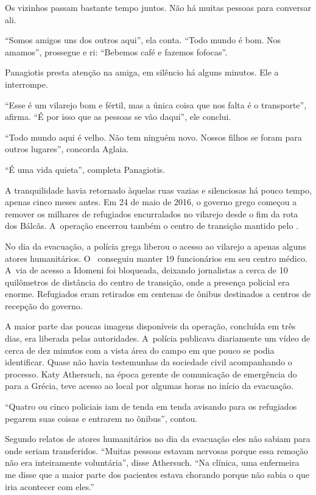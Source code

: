 Os vizinhos passam bastante tempo juntos. Não há muitas pessoas para
conversar ali.

``Somos amigos uns dos outros aqui'', ela conta. ``Todo mundo é bom. Nos
amamos'', prossegue e ri: ``Bebemos café e fazemos fofocas''.

Panagiotis presta atenção na amiga, em silêncio há alguns minutos. Ele a
interrompe.

``Esse é um vilarejo bom e fértil, mas a única coisa que nos falta é o
transporte'', afirma. ``É por isso que as pessoas se vão daqui'',
ele conclui.

``Todo mundo aqui é velho. Não tem ninguém novo. Nossos filhos se foram
para outros lugares'', concorda Aglaia.

``É uma vida quieta'', completa Panagiotis.

A tranquilidade havia retornado àquelas ruas vazias e silenciosas há
pouco tempo, apenas cinco meses antes. Em 24 de maio de 2016, o governo
grego começou a remover os milhares de refugiados encurralados no
vilarejo desde o fim da rota dos Bálcãs. A~operação encerrou também o
centro de transição mantido pelo .

No dia da evacuação, a polícia grega liberou o acesso ao vilarejo a
apenas alguns atores humanitários. O~ conseguiu manter 19
funcionários em seu centro médico. A~via de acesso a Idomeni foi
bloqueada, deixando jornalistas a cerca de 10 quilômetros de distância
do centro de transição, onde a presença policial era enorme. Refugiados
eram retirados em centenas de ônibus destinados a centros de recepção do
governo.

A maior parte das poucas imagens disponíveis da operação, concluída em
três dias, era liberada pelas autoridades. A~polícia publicava
diariamente um vídeo de cerca de dez minutos com a vista área do campo
em que pouco se podia identificar. Quase não havia testemunhas da
sociedade civil acompanhando o processo. Katy Athersuch, na época gerente
de comunicação de emergência do  para a Grécia, teve acesso ao local
por algumas horas no início da evacuação.

``Quatro ou cinco policiais iam de tenda em tenda avisando para os
refugiados pegarem suas coisas e entrarem no ônibus'', contou.

Segundo relatos de atores humanitários no dia da evacuação eles não sabiam para onde seriam 
transferidos. ``Muitas pessoas estavam nervosas
porque essa remoção não era inteiramente voluntária'', disse Athersuch.
``Na clínica, uma enfermeira me disse que a maior parte dos pacientes
estava chorando porque não sabia o que iria acontecer com eles.''

